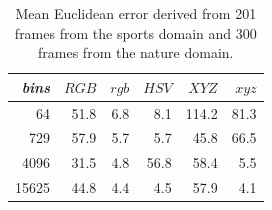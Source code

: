 \documentclass[11pt]{article}
\begin{document}
\begin{table}[!ht]
\centering
\begin{tabular}{r||r|r|r|r|r}
	\emph{bins} & $RGB$ & $rgb$ & $HSV$ & $XYZ$ & $xyz$ \\ \hline \hline
	         64 &  51.8 &   6.8 &   8.1 & 114.2 &  81.3 \\ \hline
	        729 &  57.9 &   5.7 &   5.7 &  45.8 &  66.5 \\ \hline
	       4096 &  31.5 &   4.8 &  56.8 &  58.4 &   5.5 \\ \hline
	      15625 &  44.8 &   4.4 &   4.5 &  57.9 &   4.1 \\ \hline
\end{tabular}
\caption{Mean Euclidean error derived from 201 frames from the sports domain and
300 frames from the nature domain.}
\label{tbl:error}
\end{table}
\end{document}
